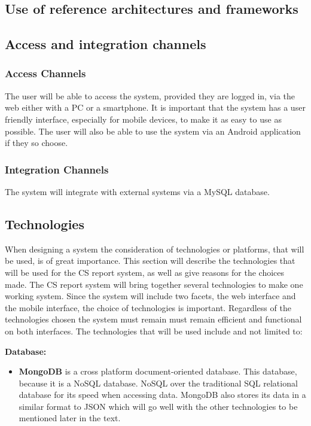 \documentclass{article}
\begin{document}
		\subsection{Use of reference architectures and frameworks}

		\subsection{Access and integration channels}
			\subsubsection{Access Channels}
				The user will be able to access the system, provided they are logged in, via the web either with a PC or a smartphone.
				It is important that the system has a user friendly interface, especially for mobile devices, to make it as easy to use as possible.
				The user will also be able to use the system via an Android application if they so choose.
			\subsubsection{Integration Channels}
				The system will integrate with external systems via a MySQL database.

		\subsection{Technologies}
		When designing a system the consideration of technologies or platforms, that will be used, is of great importance. This section will describe the technologies that will be used for the CS report system, as well as give reasons for the choices made. The CS report system will bring together several technologies to make one working system. Since the system will include two facets, the web interface and the mobile interface, the choice of technologies is important. Regardless of the technologies chosen the system must remain must remain efficient and functional on both interfaces. The technologies that will be used include and not limited to:
		
		 \textbf{Database:}\par
		 \begin{itemize}
		\item  \textbf{MongoDB} is a cross platform document-oriented database. This database, because it is a NoSQL database. NoSQL over the traditional SQL relational database for its speed when accessing data. MongoDB also stores its data in a similar format to JSON which will go well with the other technologies to be mentioned later in the text.
		\end{itemize}
		
\end{document}
